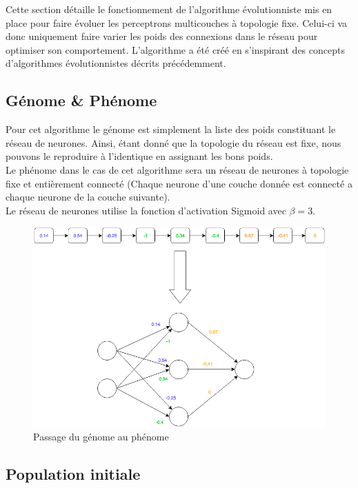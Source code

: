 \documentclass{article}
\begin{document}
Cette section détaille le fonctionnement de l'algorithme évolutionniste mis en place pour faire évoluer les perceptrons multicouches à topologie fixe. Celui-ci va donc uniquement faire varier les poids des connexions dans le réseau pour optimiser son comportement. L'algorithme a été créé en s'inspirant des concepts d'algorithmes évolutionnistes décrits précédemment.

\subsection{Génome \& Phénome}

Pour cet algorithme le génome est simplement la liste des poids constituant le réseau de neurones. Ainsi, étant donné que la topologie du réseau est fixe, nous pouvons le reproduire à l'identique en assignant les bons poids.\\

Le phénome dans le cas de cet algorithme sera un réseau de neurones à topologie fixe et entièrement connecté (Chaque neurone d'une couche donnée est connecté a chaque neurone de la couche suivante).\\

Le réseau de neurones utilise la fonction d'activation Sigmoid avec $\beta = 3$.

\begin{figure}[H]
\begin{center}
	\includegraphics[scale=0.5]{genomephenome.png}
	\caption{Passage du génome au phénome}
\end{center}
\end{figure}

\subsection{Population initiale}
\end{document}
